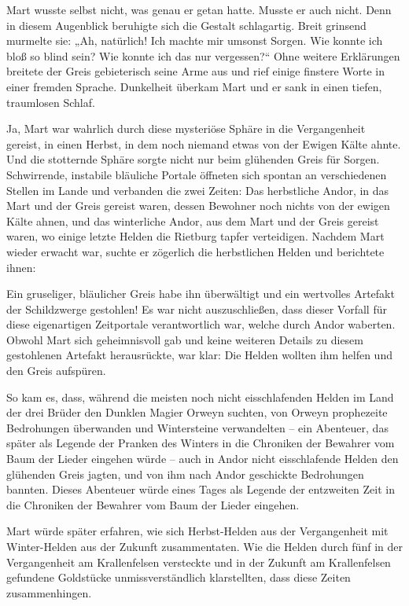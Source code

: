 Mart wusste selbst nicht, was genau er getan hatte. Musste er auch nicht. Denn in diesem Augenblick beruhigte sich die Gestalt schlagartig. Breit grinsend murmelte sie: „Ah, natürlich! Ich machte mir umsonst Sorgen. Wie konnte ich bloß so blind sein? Wie konnte ich das nur vergessen?“ Ohne weitere Erklärungen breitete der Greis gebieterisch seine Arme aus und rief einige finstere Worte in einer fremden Sprache. Dunkelheit überkam Mart und er sank in einen tiefen, traumlosen Schlaf. 



\trennzeichen



Ja, Mart war wahrlich durch diese mysteriöse Sphäre in die Vergangenheit gereist, in einen Herbst, in dem noch niemand etwas von der Ewigen Kälte ahnte. Und die stotternde Sphäre sorgte nicht nur beim glühenden Greis für Sorgen. Schwirrende, instabile bläuliche Portale öffneten sich spontan an verschiedenen Stellen im Lande und verbanden die zwei Zeiten: Das herbstliche Andor, in das Mart und der Greis gereist waren, dessen Bewohner noch nichts von der ewigen Kälte ahnen, und das winterliche Andor, aus dem Mart und der Greis gereist waren, wo einige letzte Helden die Rietburg tapfer verteidigen. Nachdem Mart wieder erwacht war, suchte er zögerlich die herbstlichen Helden und berichtete ihnen: 

Ein gruseliger, bläulicher Greis habe ihn überwältigt und ein wertvolles Artefakt der Schildzwerge gestohlen! Es war nicht auszuschließen, dass dieser Vorfall für diese eigenartigen Zeitportale verantwortlich war, welche durch Andor waberten. Obwohl Mart sich geheimnisvoll gab und keine weiteren Details zu diesem gestohlenen Artefakt herausrückte, war klar: Die Helden wollten ihm helfen und den Greis aufspüren. 


So kam es, dass, während die meisten noch nicht eisschlafenden Helden im Land der drei Brüder den Dunklen Magier Orweyn suchten, von Orweyn prophezeite Bedrohungen überwanden und Wintersteine verwandelten – ein Abenteuer, das später als Legende der Pranken des Winters in die Chroniken der Bewahrer vom Baum der Lieder eingehen würde – auch in Andor nicht eisschlafende Helden den glühenden Greis jagten, und von ihm nach Andor geschickte Bedrohungen bannten. Dieses Abenteuer würde eines Tages als Legende der entzweiten Zeit in die Chroniken der Bewahrer vom Baum der Lieder eingehen. 

Mart würde später erfahren, wie sich Herbst-Helden aus der Vergangenheit mit Winter-Helden aus der Zukunft zusammentaten. Wie die Helden durch fünf in der Vergangenheit am Krallenfelsen versteckte und in der Zukunft am Krallenfelsen gefundene Goldstücke unmissverständlich klarstellten, dass diese Zeiten zusammenhingen. 

